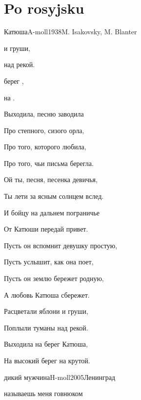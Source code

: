 \documentclass[a4paper,draft]{book}
\begin{document}
\chapter{Po rosyjsku}
\begin{otherlanguage}{russian}
\begin{song}{Катюша}{A-moll}{1938}{M. Isakovsky, M. Blanter}{}{}
	\begin{SBVerse}
	  и груши,

	  над рекой.

	  берег ,

	   на .
	\end{SBVerse}
	\begin{SBVerse}
	Выходила, песню заводила

	Про степного, сизого орла,

	Про того, которого любила,

	Про того, чьи письма берегла.
	\end{SBVerse}
	\begin{SBVerse}
	Ой ты, песня, песенка девичья,

	Ты лети за ясным солнцем вслед.

	И бойцу на дальнем пограничье

	От Катюши передай привет.
	\end{SBVerse}
	\begin{SBVerse}
	Пусть он вспомнит девушку простую,

	Пусть услышит, как она поет,

	Пусть он землю бережет родную,

	А любовь Катюша сбережет.
	\end{SBVerse}
	\begin{SBVerse}
	Расцветали яблони и груши,

	Поплыли туманы над рекой.

	Выходила на берег Катюша,

	На высокий берег на крутой.
	\end{SBVerse}
\end{song}

\begin{song}{дикий мужчина}{H-moll}{2005}{Ленинград}{}{}

	\begin{SBVerse}
	 называешь меня говнюком


\end{SBVerse}
\end{song}
\end{otherlanguage}
\end{document}
